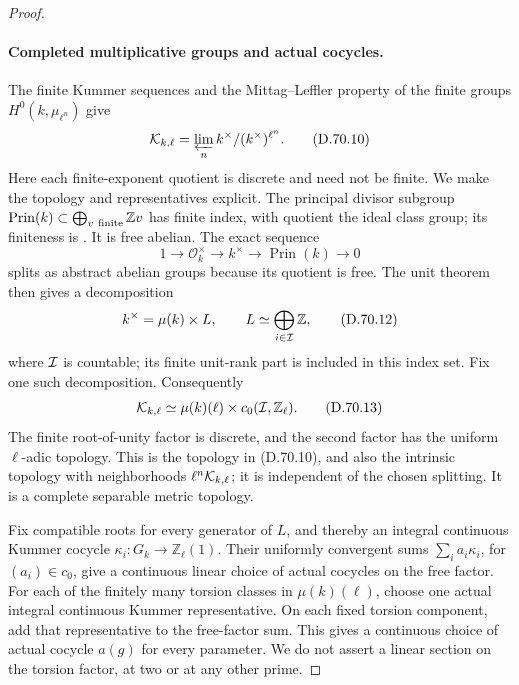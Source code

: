 \begin{proof}
\paragraph{Completed multiplicative groups and actual cocycles.}
The finite Kummer sequences and the Mittag--Leffler
property of the finite groups \(H^0(k,\mu_{\ell^n})\) give
\[
 {\cal K}_{k,\ell}=\varprojlim_n
                         k^\times/(k^\times)^{\ell^n}. \tag{D.70.10}
\]
Here each finite-exponent quotient is discrete and need
not be finite. We make the topology and representatives
explicit. The principal divisor subgroup
\(\operatorname{Prin}(k)\subset\bigoplus_{v\ {\rm finite}}
\mathbb Z v\) has finite index, with quotient the ideal
class group; its finiteness is
\cite[Theorem 4.4]{DE_MilneANT}. It is free abelian.
The exact sequence
\[
 1\longrightarrow\mathcal O_k^\times
 \longrightarrow k^\times\longrightarrow
             \operatorname{Prin}(k)\longrightarrow0
                                                        \tag{D.70.11}
\]
splits as abstract abelian groups because its quotient
is free. The unit theorem
\cite[Theorem 5.1]{DE_MilneANT} then gives a decomposition
\[
       k^\times=\mu(k)\times L,\qquad
       L\simeq\bigoplus_{i\in{\cal I}}\mathbb Z,
                                                        \tag{D.70.12}
\]
where \({\cal I}\) is countable; its finite unit-rank
part is included in this index set. Fix one such
decomposition. Consequently
\[
 {\cal K}_{k,\ell}\simeq
       \mu(k)(\ell)\times c_0({\cal I},\mathbb Z_\ell).
                                                        \tag{D.70.13}
\]
The finite root-of-unity factor is discrete, and the
second factor has the uniform \(\ell\)-adic topology.
This is the topology in (D.70.10), and also the intrinsic
topology with neighborhoods \(\ell^n{\cal K}_{k,\ell}\);
it is independent of the chosen splitting. It is a
complete separable metric topology.

Fix compatible roots for every generator of \(L\),
and thereby an integral continuous Kummer cocycle
\(\kappa_i:G_k\to\mathbb Z_\ell(1)\). Their uniformly
convergent sums
\(\sum_i a_i\kappa_i\), for \((a_i)\in c_0\), give a
continuous linear choice of actual cocycles on the
free factor. For each of the finitely many torsion
classes in \(\mu(k)(\ell)\), choose one actual integral
continuous Kummer representative. On each fixed
torsion component, add that representative to the
free-factor sum. This gives a continuous choice of
actual cocycle \(a(g)\) for every parameter. We do
not assert a linear section on the torsion factor,
at two or at any other prime.


\end{proof}
